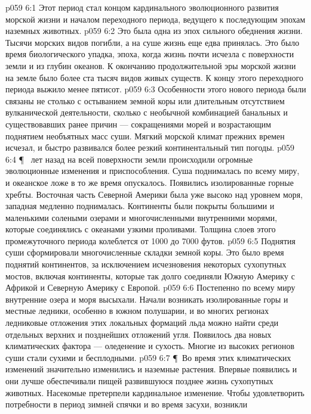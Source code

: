 \vs p059 6:1 Этот период стал концом кардинального эволюционного развития морской жизни и началом переходного периода, ведущего к последующим эпохам наземных животных.
\vs p059 6:2 Это была одна из эпох сильного обеднения жизни. Тысячи морских видов погибли, а на суше жизнь еще едва принялась. Это было время биологического упадка, эпоха, когда жизнь почти исчезла с поверхности земли и из глубин океанов. К окончанию продолжительной эры морской жизни на земле было более ста тысяч видов живых существ. К концу этого переходного периода выжило менее пятисот.
\vs p059 6:3 Особенности этого нового периода были связаны не столько с остыванием земной коры или длительным отсутствием вулканической деятельности, сколько с необычной комбинацией банальных и существовавших ранее причин --- сокращениями морей и возрастающим поднятием необъятных масс суши. Мягкий морской климат прежних времен исчезал, и быстро развивался более резкий континентальный тип погоды.
\vs p059 6:4 \P\  лет назад на всей поверхности земли происходили огромные эволюционные изменения и приспособления. Суша поднималась по всему миру, и океанское ложе в то же время опускалось. Появились изолированные горные хребты. Восточная часть Северной Америки была уже высоко над уровнем моря, западная медленно поднималась. Континенты были покрыты большими и маленькими солеными озерами и многочисленными внутренними морями, которые соединялись с океанами узкими проливами. Толщина слоев этого промежуточного периода колеблется от 1000 до 7000 футов.
\vs p059 6:5 Поднятия суши сформировали многочисленные складки земной коры. Это было время поднятий континентов, за исключением исчезновения некоторых сухопутных мостов, включая континенты, которые так долго соединяли Южную Америку с Африкой и Северную Америку с Европой.
\vs p059 6:6 Постепенно по всему миру внутренние озера и моря высыхали. Начали возникать изолированные горы и местные ледники, особенно в южном полушарии, и во многих регионах ледниковые отложения этих локальных формаций льда можно найти среди отдельных верхних и позднейших отложений угля. Появилось два новых климатических фактора --- оледенение и сухость. Многие из высоких регионов суши стали сухими и бесплодными.
\vs p059 6:7 \P\ Во время этих климатических изменений значительно изменились и наземные растения. Впервые появились  и они лучше обеспечивали пищей развившуюся позднее жизнь сухопутных животных. Насекомые претерпели кардинальное изменение. Чтобы удовлетворить потребности в период зимней спячки и во время засухи, возникли 
